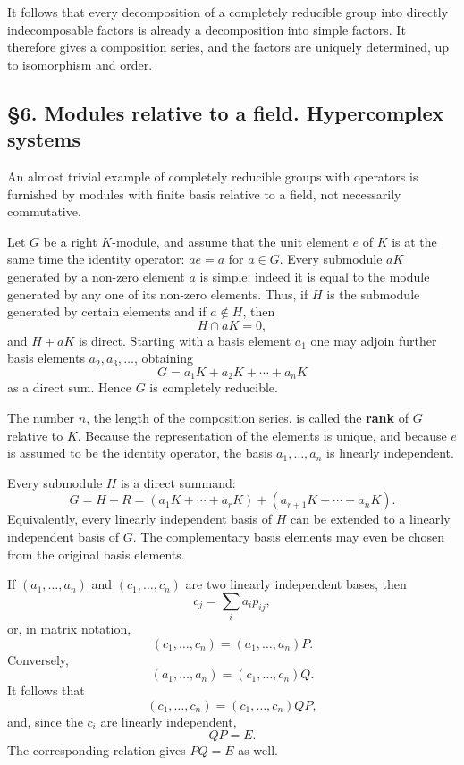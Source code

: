 \documentclass[
  11pt,
]{article}
\begin{document}
It follows that every decomposition of a completely reducible group into
directly indecomposable factors is already a decomposition into simple
factors. It therefore gives a composition series, and the factors are
uniquely determined, up to isomorphism and order.

\subsection{§6. Modules relative to a field. Hypercomplex
systems}\label{modules-relative-to-a-field.-hypercomplex-systems}

An almost trivial example of completely reducible groups with operators
is furnished by modules with finite basis relative to a field, not
necessarily commutative.

Let \(G\) be a right \(K\)-module, and assume that the unit element
\(e\) of \(K\) is at the same time the identity operator: \(ae=a\) for
\(a\in G\). Every submodule \(aK\) generated by a non-zero element \(a\)
is simple; indeed it is equal to the module generated by any one of its
non-zero elements. Thus, if \(H\) is the submodule generated by certain
elements and if \(a\notin H\), then \[
  H\cap aK=0,
\] and \(H+aK\) is direct. Starting with a basis element \(a_1\) one may
adjoin further basis elements \(a_2,a_3,\ldots\), obtaining \[
  G=a_1K+a_2K+\cdots+a_nK
\] as a direct sum. Hence \(G\) is completely reducible.

The number \(n\), the length of the composition series, is called the
\textbf{rank} of \(G\) relative to \(K\). Because the representation of
the elements is unique, and because \(e\) is assumed to be the identity
operator, the basis \(a_1,\ldots,a_n\) is linearly independent.

Every submodule \(H\) is a direct summand: \[
  G=H+R=(a_1K+\cdots+a_rK)+(a_{r+1}K+\cdots+a_nK).
\] Equivalently, every linearly independent basis of \(H\) can be
extended to a linearly independent basis of \(G\). The complementary
basis elements may even be chosen from the original basis elements.

If \((a_1,\ldots,a_n)\) and \((c_1,\ldots,c_n)\) are two linearly
independent bases, then \[
  c_j=\sum_i a_i p_{ij},
\] or, in matrix notation, \[
  (c_1,\ldots,c_n)=(a_1,\ldots,a_n)P.
\] Conversely, \[
  (a_1,\ldots,a_n)=(c_1,\ldots,c_n)Q.
\] It follows that \[
  (c_1,\ldots,c_n)=(c_1,\ldots,c_n)QP,
\] and, since the \(c_i\) are linearly independent, \[
  QP=E.
\] The corresponding relation gives \(PQ=E\) as well.
\end{document}
